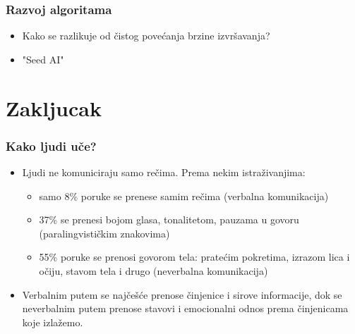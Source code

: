 \documentclass{beamer}
\begin{document}
\begin{frame}[fragile]\frametitle{Razvoj algoritama}
    \begin{itemize}	
        \item Kako se razlikuje od čistog povećanja brzine izvršavanja?
        \item "Seed AI"
    \end{itemize}
\end{frame}

\section{Zakljucak}

\begin{frame}[fragile]\frametitle{Kako ljudi uče?}
	\begin{itemize}	
		\item Ljudi ne komuniciraju samo rečima. Prema nekim
		istraživanjima:
		\begin{itemize}
			\item samo 8\% poruke se prenese samim rečima (verbalna komunikacija)
			\item 37\% se prenesi bojom glasa, tonalitetom, pauzama u govoru (paralingvističkim znakovima)
			\item 55\% poruke se prenosi govorom tela: pratećim pokretima, izrazom lica i
			očiju, stavom tela i drugo (neverbalna komunikacija)
		\end{itemize}
		\item Verbalnim putem se najčešće prenose činjenice i
		sirove informacije, dok se neverbalnim putem prenose stavovi i
		emocionalni odnos prema činjenicama koje izlažemo.
	\end{itemize}
\end{frame}
\end{document}
